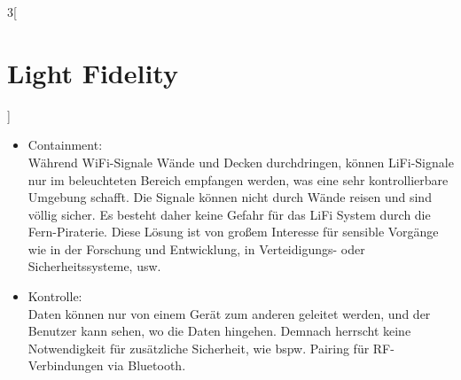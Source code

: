 \begin{multicols}{3}[\section{Light Fidelity}]
\begin{itemize}
	\item Containment: \\
		Während WiFi-Signale Wände und Decken durchdringen, können LiFi-Signale nur im beleuchteten Bereich empfangen werden, was eine sehr kontrollierbare Umgebung schafft. Die Signale können nicht durch Wände reisen und sind völlig sicher. Es besteht daher keine Gefahr für das LiFi System  durch die Fern-Piraterie. Diese Lösung ist von großem Interesse für sensible Vorgänge wie in der Forschung und Entwicklung, in Verteidigungs- oder Sicherheitssysteme, usw.
		
\item Kontrolle: \\
 Daten können nur von einem Gerät zum anderen geleitet werden, und der Benutzer kann sehen, wo die Daten hingehen. Demnach herrscht keine Notwendigkeit für zusätzliche Sicherheit, wie bspw. Pairing für RF-Verbindungen via Bluetooth.
\end{itemize}
		


\end{multicols}
